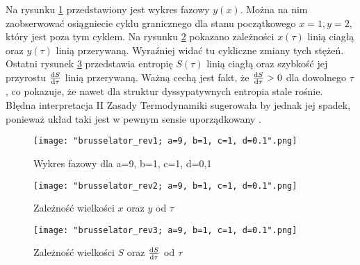 \documentclass[10pt, a4paper, twoside, onecolumn]{article}
\numberwithin{equation}{section}
\begin{document}
	Na rysunku \ref{fig:rev_brus_fazowy} przedstawiony jest wykres fazowy \(y(x)\). Można na nim zaobserwować osiągniecie cyklu granicznego dla stanu początkowego \(x=1, y=2\), który jest poza tym cyklem. Na rysunku \ref{fig:rev_brus_xy_t} pokazano zależności \(x(\tau)\) linią ciagłą oraz \(y(\tau)\) linią przerywaną. Wyraźniej widać tu cykliczne zmiany tych stężeń. Ostatni rysunek \ref{fig:rev_brus_entropia} przedstawia entropię \(S(\tau)\) linią ciagłą oraz szybkość jej przyrostu \(\dv{S}{\tau}(\tau)\) linią przerywaną. Ważną cechą jest fakt, że \(\dv{S}{\tau}(\tau)>0\) dla dowolnego \(\tau\), co pokazuje, że nawet dla struktur dyssypatywnych entropia stale rośnie. Błędna interpretacja II Zasady Termodynamiki sugerowała by jednak jej spadek, ponieważ układ taki jest w pewnym sensie uporządkowany \cite{orlik_sily_w_przyrodzie}.
	\begin{figure}[H]
		\centering
		\texttt{[image: "brusselator\_rev1; a=9, b=1, c=1, d=0.1".png]}
		\caption{Wykres fazowy dla a=9, b=1, c=1, d=0,1}
		\label{fig:rev_brus_fazowy}
	\end{figure}
	\begin{figure}[H]
		\centering
		\texttt{[image: "brusselator\_rev2; a=9, b=1, c=1, d=0.1".png]}
		\caption{Zależność wielkości \(x\) oraz \(y\) od \(\tau\)}
		\label{fig:rev_brus_xy_t}
	\end{figure}
	\begin{figure}[H]
		\centering
		\texttt{[image: "brusselator\_rev3; a=9, b=1, c=1, d=0.1".png]}
		\caption{Zależność wielkości \(S\) oraz \(\dv{S}{\tau}\) od \(\tau\)}
		\label{fig:rev_brus_entropia}
	\end{figure}
	
\end{document}
